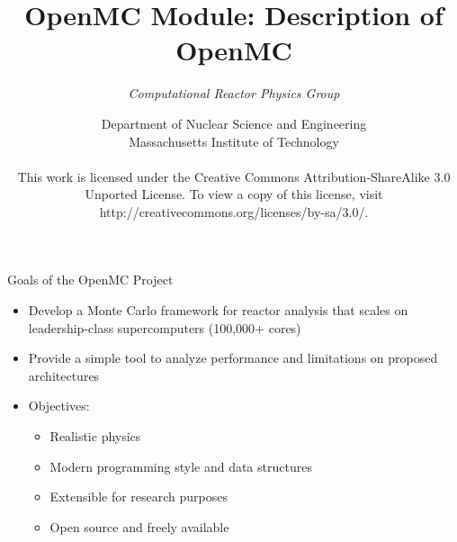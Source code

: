 \documentclass[serif]{beamer}
\title{OpenMC Module: Description of OpenMC}
\author{\emph{Computational Reactor Physics Group}}
\date{\normalsize Department of Nuclear Science and Engineering\\
                  Massachusetts Institute of Technology \\
~\\
\tiny{This work is licensed under the Creative Commons Attribution-ShareAlike 3.0 Unported License. To view a copy of this license, visit http://creativecommons.org/licenses/by-sa/3.0/.}}
\begin{document}

\frame{\titlepage}\logo{} %


\begin{frame}{Goals of the OpenMC Project}
  \begin{itemize}
    \vfill
    \item<1-> Develop a Monte Carlo framework for reactor analysis that scales
      on leadership-class supercomputers (100,000+ cores)
    \vfill
    \item<1-> Provide a simple tool to analyze performance and limitations on
      proposed architectures
    \vfill
    \item<1-> Objectives:
      \begin{itemize}
      \item<1-> Realistic physics
      \item<1-> Modern programming style and data structures
      \item<1-> Extensible for research purposes
      \item<1-> Open source and freely available
      \vfill
      \end{itemize}
  \end{itemize}
\end{frame}

\end{document}
